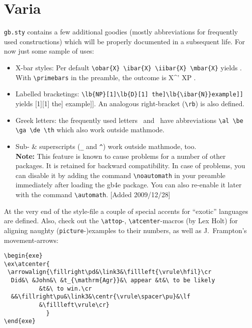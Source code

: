 \documentclass[11pt,a4paper]{article}
\begin{document}
\section{Varia}
{\tt gb\gbVersion.sty} contains a few additional goodies (mostly
abbreviations for frequently used constructions) which will be
properly documented in a subsequent life. For now just some sample of
uses:
\begin{itemize}
\item X-bar styles: Per default \verb,\obar{X} \ibar{X} \iibar{X} \mbar{X},
  yields    . With \verb,\primebars,
  in the preamble, the outcome is  X^{'} XP .
\item Labelled bracketings:
\verb,\lb{NP}[1]\lb{D}[1] the]\lb{\ibar{N}},\break \verb,example]], yields 
[1][1] the] example]]. An analogous
right-bracket (\verb,\rb,) is also defined. 
\item Greek letters: the frequently used letters \al\be\ga\de\ and
  \th\  have abbreviations \verb,\al \be \ga \de \th, which also work
  outside mathmode.
\item Sub- \& superscripts (\verb,_, and \verb,^,) work outside mathmode, too.
\\
{\bf Note:} This feature is known to cause problems for a number of
other packages. It is retained for backward compatibility. In case of problems,
you can disable it by adding the command \verb|\noautomath| in your preamble 
immediately after loading the gb4e package. You can also re-enable it later with
the command \verb|\automath|. [Added 2009/12/28]

\end{itemize}
At the very end of the style-file a couple of special accents for
``exotic'' languages are defined.  Also, check out the \verb,\attop,-,
\verb,\atcenter,-macros (by Lex Holt) for aligning naughty
({\tt picture}-)examples to their numbers, as well as J.~Frampton's
movement-arrows: 
\begin{exe}
\ex{}
\end{exe}
\begin{verbatim}
\begin{exe}
\ex\atcenter{
 \arrowalign{\fillright\pd&\link3&\fillleft{\vrule\hfil}\cr
  Did&\ &John&\ &t_{\mathrm{Agr}}&\ appear &t&\ to be likely 
          &t&\ to win.\cr
  &&\fillright\pu&\link3&\centr{\vrule\spacer\pu}&\lf
          &\fillleft\vrule\cr}
            }
\end{exe}
\end{verbatim}
\end{document}
